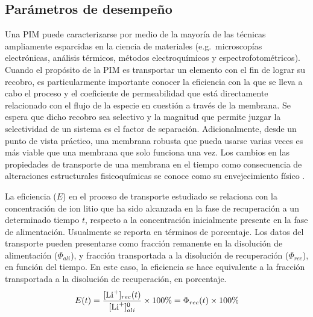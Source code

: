 
\subsection{Parámetros de desempeño}\label{sec:performanceparameters}
Una PIM puede caracterizarse por medio de la mayoría de las técnicas ampliamente esparcidas en la ciencia de materiales (e.g.\ microscopías electrónicas, análisis térmicos, métodos electroquímicos y espectrofotométricos). Cuando el propósito de la \ac{PIM} es transportar un elemento con el fin de lograr su recobro, es particularmente importante conocer la eficiencia con la que se lleva a cabo el proceso y el coeficiente de permeabilidad que está directamente relacionado con el flujo de la especie en cuestión a través de la membrana. Se espera que dicho recobro sea selectivo y la magnitud que permite juzgar la selectividad de un sistema es el factor de separación. Adicionalmente, desde un punto de vista práctico, una membrana robusta que pueda usarse varias veces es más viable que una membrana que solo funciona una vez. Los cambios en las propiedades de transporte de una membrana en el tiempo como consecuencia de alteraciones estructurales fisicoquímicas se conoce como su envejecimiento físico \citep{Koros}.

La eficiencia ($E$) en el proceso de transporte estudiado se relaciona con la concentración de ion litio que ha sido alcanzada en la fase de recuperación a un determinado tiempo $t$, respecto a la concentración inicialmente presente en la fase de alimentación. Usualmente se reporta en términos de porcentaje. Los datos del transporte pueden presentarse como fracción remanente en la disolución de alimentación ($\Phi_{ali}$), y fracción transportada a la disolución de recuperación ($\Phi_{rec}$), en función del tiempo. En este caso, la eficiencia se hace equivalente a la fracción transportada a la disolución de recuperación, en porcentaje.
\begin{equation}
    E(t)=\frac{[\ce{Li^+}]_{rec}(t)}{[\ce{Li^+}]_{ali}^0}\times100\% = \Phi_{rec}(t)\times100\%
\end{equation}

